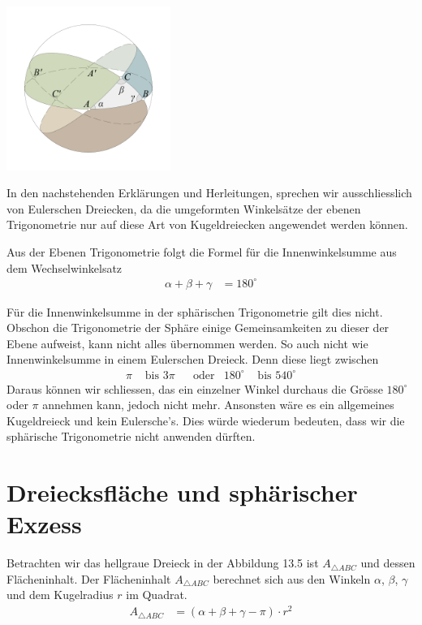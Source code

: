 \begin{refsection}
\begin{center}
        \includegraphics[width=0.4\textwidth]{kugel/EulerschesDreieck.jpg}
\end{center}

In den nachstehenden Erklärungen und Herleitungen, sprechen wir ausschliesslich von Eulerschen Dreiecken, da die umgeformten Winkelsätze der ebenen Trigonometrie nur auf diese Art von Kugeldreiecken angewendet werden können.

Aus der Ebenen Trigonometrie folgt die Formel für die Innenwinkelsumme aus dem Wechselwinkelsatz
\begin{align*}
\alpha + \beta + \gamma &= 180^{\circ}
\end{align*}

Für die Innenwinkelsumme in der sphärischen Trigonometrie gilt dies nicht. Obschon die Trigonometrie der Sphäre einige Gemeinsamkeiten zu dieser der Ebene aufweist, kann nicht alles übernommen werden.
So auch nicht wie Innenwinkelsumme in einem Eulerschen Dreieck.
Denn diese liegt zwischen
\[
\begin{aligned}
\pi
&\text{ bis }
3\pi
&
&\text{oder}
&
180^{\circ}
&\text{ bis }
540^{\circ}
\end{aligned}
\]
Daraus können wir schliessen, das ein einzelner Winkel durchaus die Grösse $180^{\circ}$ oder $\pi$ annehmen kann, jedoch nicht mehr. Ansonsten wäre es ein allgemeines Kugeldreieck und kein Eulersche’s. Dies würde wiederum bedeuten, dass wir die sphärische Trigonometrie nicht anwenden dürften.



\section{Dreiecksfläche und sphärischer Exzess} \label{Flaeche} 
Betrachten wir das hellgraue Dreieck in der Abbildung 13.5 ist $A_{ \triangle{ ABC }}$ und dessen Flächeninhalt. Der Flächeninhalt $A_{ \triangle{ ABC }}$ berechnet sich aus den Winkeln $\alpha$, $\beta$, $\gamma$ und dem Kugelradius $r$ im Quadrat.
\begin{align*}
A_{ \triangle{ ABC }} &= (\alpha + \beta + \gamma - \pi) \cdot r^2
\end{align*}


\end{refsection}
